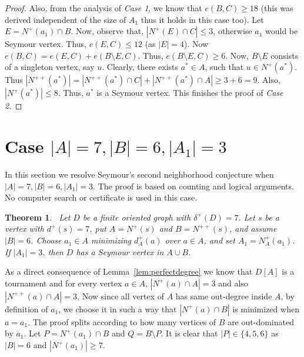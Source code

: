 \documentclass[a4paper,fleqn]{cas-sc}
\newtheorem{theorem}{Theorem}[section]
\theoremstyle{definition}
\begin{document}
\begin{proof}
Also, from the analysis of \emph{Case 1}, we know that $e(B,C)\geq 18$ (this was derived independent of the size of $A_1$ thus it holds in this case too). Let $E=N^{+}(a_1)\cap B$. Now, observe that, $|N^+(E)\cap C|\leq 3$, otherwise $a_1$ would be Seymour vertex. Thus, $e(E,C)\leq 12$ (as $|E|=4$). Now $e(B,C)=e(E,C)+e(B\setminus E,C)$. Thus, $e(B\setminus E,C)\geq 6$. Now, $B\setminus E$ consists of a singleton vertex, say $u$. Clearly, there exists $a^*\in A$, such that $u\in N^+(a^*)$. Thus $|N^{++}(a^*)|=|N^{++}(a^*)\cap C| + |N^{++}(a^*)\cap A|\geq 3+6=9$. Also, $|N^+(a^*)|\leq 8$. Thus, $a^*$ is a Seymour vertex. This finishes the proof of \emph{Case 2}.




\end{proof}


\section{Case $|A|=7, |B|=6, |A_1|=3$}
In this section we resolve Seymour’s second neighborhood conjecture when $|A| = 7, |B| = 6, |A_1|=3$. The proof is based on counting and logical arguments. No computer search or certificate is used in this case.


\begin{theorem}~\label{thm:Case B6A_1_3}
Let $D$ be a finite oriented graph with $\delta^+(D)=7$. Let $s$ be a vertex with $d^+(s)=7$, put $A=N^+(s)$ and $B=N^{++}(s)$, and assume $|B|=6$. Choose $a_1\in A$ minimizing $d_A^+(a)$ over $a\in A$, and set $A_1=N_A^+(a_1)$. If $|A_1|=3$, then $D$ has a Seymour vertex in $A\cup B$.
\end{theorem}


As a direct consequence of Lemma~\ref{lem:perfectdegree} we know that $D[A]$ is a tournament and for every vertex $a\in A$, $|N^+(a) \cap A|=3$ and also $|N^{++}(a)\cap A|=3$. Now since all vertex of $A$ has same out-degree inside $A$, by definition of $a_1$, we choose it in such a way that $|N^+(a)\cap B|$ is minimized when $a=a_1$.
The proof splits according to how many vertices of $B$ are out-dominated by $a_1$. Let $P=N^+(a_1)\cap B$ and $Q=B\setminus P$. It is clear that  $|P| \in \{4,5,6\}$ as $|B|=6$ and $|N^+(a_1)|\geq 7$.



\end{document}
